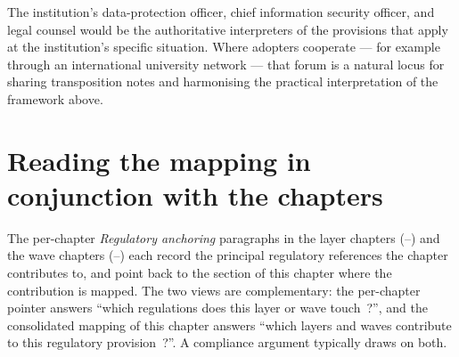 \noindent The institution's data-protection officer, chief
information security officer, and legal counsel would be the
authoritative interpreters of the provisions that apply at the
institution's specific situation. Where adopters cooperate --- for example through an international
university network --- that forum is a natural locus for sharing
transposition notes and harmonising the practical interpretation of
the framework above.

\section{Reading the mapping in conjunction with the chapters}
\label{sec:rm-using}

The per-chapter \emph{Regulatory anchoring} paragraphs in the
layer chapters (--)
and the wave chapters
(--)
each record the principal regulatory references the chapter
contributes to, and point back to the section of this chapter
where the contribution is mapped. The two views are
complementary: the per-chapter pointer answers ``which
regulations does this layer or wave touch~?'', and the
consolidated mapping of this chapter answers ``which layers and
waves contribute to this regulatory provision~?''. A compliance
argument typically draws on both.
